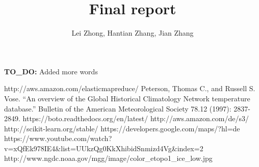 \documentclass[a4paper]{article}
\begin{document}
\newtheorem{thm}{Theorem}
\newtheorem*{thm*}{Theorem}
\newtheorem{lem}{Lemma}
\newtheorem{cla}{Claim}
\newtheorem{prop}{Proposition}

\title{Final report}

\author{Lei Zhong, Hantian Zhang, Jian Zhang}
\date{}
\maketitle

\textbf{TO\_DO:}
Added more words







%
%
\begin{thebibliography}{1}
     http://aws.amazon.com/elasticmapreduce/
     Peterson, Thomas C., and Russell S. Vose. ``An overview of the Global Historical Climatology Network temperature database.'' Bulletin of the American Meteorological Society 78.12 (1997): 2837-2849.
     https://boto.readthedocs.org/en/latest/
     http://aws.amazon.com/de/s3/
     http://scikit-learn.org/stable/
     https://developers.google.com/maps/?hl=de
     https://www.youtube.com/watch?v=xQfEk978IE4\&list=UUkzQg0KkXhibidSnmizd4Vg\&index=2
     http://www.ngdc.noaa.gov/mgg/image/color\_etopo1\_ice\_low.jpg
\end{thebibliography}
\end{document}
